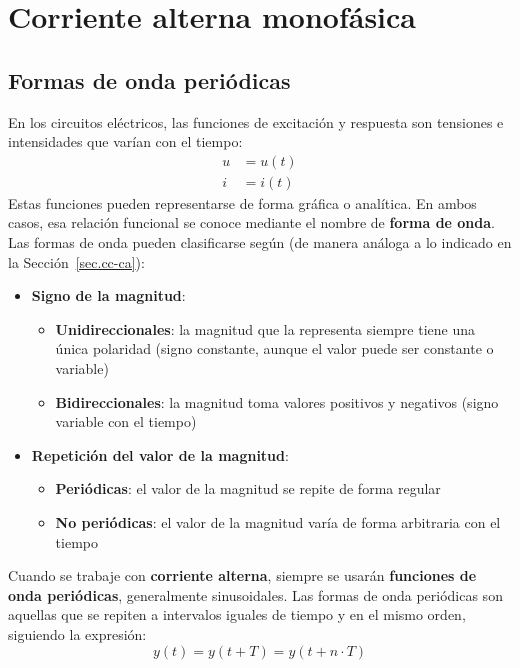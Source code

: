 \chapter{Corriente alterna monofásica}\label{chap.ca_mono}
 	
\section{Formas de onda periódicas}
 	
En los circuitos eléctricos, las funciones de excitación y respuesta
son tensiones e intensidades que varían con el tiempo:
\begin{align*}
  u&=u(t)\\
  i&=i(t)
\end{align*}
Estas funciones pueden representarse de forma gráfica o analítica. En
ambos casos, esa relación funcional se conoce mediante el nombre de
\textbf{forma de onda}. Las formas de onda pueden clasificarse según
(de manera análoga a lo indicado en la Sección~\ref{sec.cc-ca}):
\begin{itemize}
\item \textbf{Signo de la magnitud}:
  \begin{itemize}
  \item \textbf{Unidireccionales}: la magnitud que la representa
    siempre tiene una única polaridad (signo constante, aunque el
    valor puede ser constante o variable)
  \item \textbf{Bidireccionales}: la magnitud toma valores positivos y
    negativos (signo variable con el tiempo)
  \end{itemize}
\item \textbf{Repetición del valor de la magnitud}:
  \begin{itemize}
  \item \textbf{Periódicas}: el valor de la magnitud se repite de
    forma regular
  \item \textbf{No periódicas}: el valor de la magnitud varía de forma
    arbitraria con el tiempo
  \end{itemize}
\end{itemize}

Cuando se trabaje con \textbf{corriente alterna}, siempre se usarán
\textbf{funciones de onda periódicas}, generalmente sinusoidales. Las
formas de onda periódicas son aquellas que se repiten a intervalos
iguales de tiempo y en el mismo orden, siguiendo la expresión:
\begin{equation*}
  y(t)=y(t+T)=y(t+n\cdot T)
\end{equation*}
	
